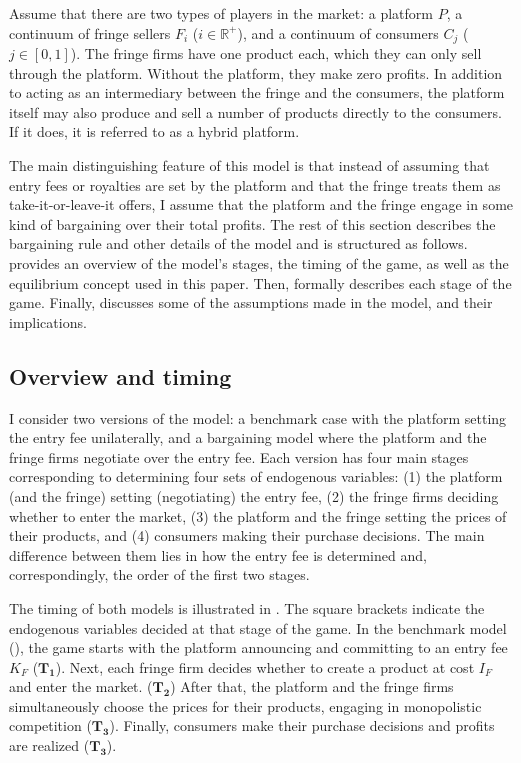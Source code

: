 Assume that there are two types of players in the market: a platform $P$, a continuum of fringe sellers $F_i$ ($i \in \mathbb{R}^+$), and a continuum of consumers $C_j$ ($j \in [0, 1]$).
The fringe firms have one product each, which they can only sell through the platform.
Without the platform, they make zero profits.
In addition to acting as an intermediary between the fringe and the consumers, the platform itself may also produce and sell a number of products directly to the consumers.
If it does, it is referred to as a hybrid platform.

The main distinguishing feature of this model is that instead of assuming that entry fees or royalties are set by the platform and that the fringe treats them as take-it-or-leave-it offers, I assume that the platform and the fringe engage in some kind of bargaining over their total profits.
The rest of this section describes the bargaining rule and other details of the model and is structured as follows.
 provides an overview of the model's stages, the timing of the game, as well as the equilibrium concept used in this paper.
Then,  formally describes each stage of the game.
Finally,  discusses some of the assumptions made in the model, and their implications.

\subsection{Overview and timing}
\label{sec:model_overview}

I consider two versions of the model: a benchmark case with the platform setting the entry fee unilaterally, and a bargaining model where the platform and the fringe firms negotiate over the entry fee.
Each version has four main stages corresponding to determining four sets of endogenous variables: (1) the platform (and the fringe) setting (negotiating) the entry fee, (2) the fringe firms deciding whether to enter the market, (3) the platform and the fringe setting the prices of their products, and (4) consumers making their purchase decisions.
The main difference between them lies in how the entry fee is determined and, correspondingly, the order of the first two stages.

The timing of both models is illustrated in .
The square brackets indicate the endogenous variables decided at that stage of the game.
In the benchmark model (), the game starts with the platform announcing and committing to an entry fee $K_F$ ($\mathbf{T_1}$).
Next, each fringe firm decides whether to create a product at cost $I_F$ and enter the market. ($\mathbf{T_2}$)
After that, the platform and the fringe firms simultaneously choose the prices for their products, engaging in monopolistic competition ($\mathbf{T_3}$).
Finally, consumers make their purchase decisions and profits are realized ($\mathbf{T_3}$).

